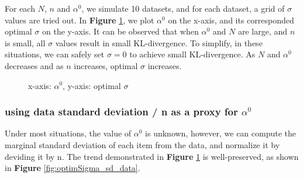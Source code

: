 \documentclass[11pt, oneside]{article}   	%
\begin{document}
For each $N$, $n$ and $\alpha^0$, we simulate 10 datasets, and for each dataset, a grid of $\sigma$ values are tried out. In \textbf{Figure }\ref{fig:optimSigma}, we plot $\alpha^0$ on the x-axis, and its corresponded optimal $\sigma$ on the y-axis. It can be observed that when $\alpha^0$ and $N$ are large, and $n$ is small, all $\sigma$ values result in small KL-divergence. To simplify, in these situations, we can safely set $\sigma = 0$ to achieve small KL-divergence. As $N$ and $\alpha^0$ decreases and as $n$ increases, optimal $\sigma$ increases.
\begin{figure}[h!]
		\caption{x-axis: $\alpha^0$, y-axis: optimal $\sigma$}
		\label{fig:optimSigma}
\end{figure}

\subsubsection{using data standard deviation / n as a proxy for $\alpha^0$}
Under most situations, the value of $\alpha^0$ is unknown, however, we can compute the marginal standard deviation of each item from the data, and normalize it by deviding it by n. The trend demonstrated in \textbf{Figure }\ref{fig:optimSigma} is well-preserved, as shown in \textbf{Figure }\ref{fig:optimSigma_sd_data}.
\end{document}
